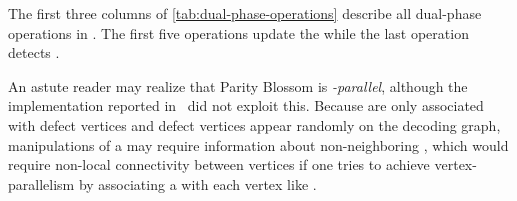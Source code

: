 The first three columns of \autoref{tab:dual-phase-operations} describe all dual-phase operations in \cite{wu2023qce}.
The first five operations update the \covs while the last operation detects \confs.

An astute reader may realize that Parity Blossom is \cov\emph{-parallel}, although the implementation reported in~\cite{wu2023qce} did not exploit this.
Because \covs are only associated with defect vertices and defect vertices appear randomly on the decoding graph, manipulations of a \cov may require information about non-neighboring \covs, which would require non-local connectivity between vertices if one tries to achieve vertex-parallelism by associating a \PU with each vertex like \arch.
